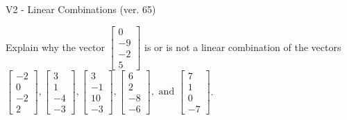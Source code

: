 \begin{exercise}
  \begin{exerciseTitle}V2 - Linear Combinations (ver. 65)\end{exerciseTitle}
  \begin{exerciseStatement}
    Explain why the vector \(\left[\begin{array}{c}
0 \\
-9 \\
-2 \\
5
\end{array}\right]\)  is or is not a linear 
	combination of the vectors \(\left[\begin{array}{c}
-2 \\
0 \\
-2 \\
2
\end{array}\right] , \left[\begin{array}{c}
3 \\
1 \\
-4 \\
-3
\end{array}\right] , \left[\begin{array}{c}
3 \\
-1 \\
10 \\
-3
\end{array}\right] , \left[\begin{array}{c}
6 \\
2 \\
-8 \\
-6
\end{array}\right] , \text{ and } \left[\begin{array}{c}
7 \\
1 \\
0 \\
-7
\end{array}\right]\).
	



\end{exerciseStatement}
\end{exercise}
